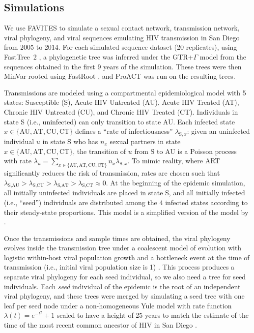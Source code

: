 \documentclass[oupdraft]{sysbio}
\begin{document}
\subsection{Simulations}
We use FAVITES to simulate a sexual contact network, transmission network, viral phylogeny, and viral sequences emulating HIV transmission in San Diego from 2005 to 2014. 
For each simulated sequence dataset (20 replicates),
using FastTree~2 \cite{Price2010},
a phylogenetic tree was inferred under the GTR+$\Gamma$  model from the sequences obtained in the first 9 years of the simulation.
These trees were then MinVar-rooted using FastRoot \cite{Mai2017},
and ProACT was run on the resulting trees.

Transmissions are modeled using a compartmental epidemiological model with 5 states: Susceptible (S), Acute HIV Untreated (AU), Acute HIV Treated (AT), Chronic HIV Untreated (CU), and Chronic HIV Treated (CT). Individuals in state S (i.e., uninfected) can only transition to state AU. Each infected state $x\in\{\text{AU},\text{AT},\text{CU},\text{CT}\}$ defines a ``rate of infectiousness'' $\lambda_{\text{S},x}$: given an uninfected individual $u$ in state S who has $n_x$ sexual partners in state $x\in\{\text{AU},\text{AT},\text{CU},\text{CT}\}$, the transition of $u$ from S to AU is a Poisson process with rate $\lambda_u=\sum_{x\in\{\text{AU},\text{AT},\text{CU},\text{CT}\}}{n_{x}\lambda_{\text{S},x}}$. To mimic reality, where ART significantly reduces the risk of transmission, rates are chosen such that $\lambda_{\text{S},\text{AU}} > \lambda_{\text{S},\text{CU}} > \lambda_{\text{S},\text{AT}} > \lambda_{\text{S},\text{CT}} \approx 0$. At the beginning of the epidemic simulation, all initially uninfected individuals are placed in state S, and all initially infected (i.e., ``seed'') individuals are distributed among the 4 infected states according to their steady-state proportions.
This model is a simplified version of the model  by \citet{Granich2009}.

Once the transmissions and sample times are obtained, the viral phylogeny evolves inside the transmission tree under a coalescent model of evolution with logistic within-host viral population growth and a bottleneck event at the time of transmission (i.e., initial viral population size is 1) \cite{Ratmann2017}.
This process produces a separate viral phylogeny for each seed individual, so we also need a tree for seed individuals. Each \textit{seed} individual of the epidemic is the root of an independent viral phylogeny, and these trees were merged by simulating a seed tree with one leaf per seed node under a non-homogeneous Yule model \cite{LeGat2016} with rate function $\lambda(t)=e^{-t^2}+1$ scaled to have a height of 25 years to match the estimate of the time of the most recent common ancestor of HIV in San Diego \citep[see][for details]{Moshiri2018}. 
\end{document}
